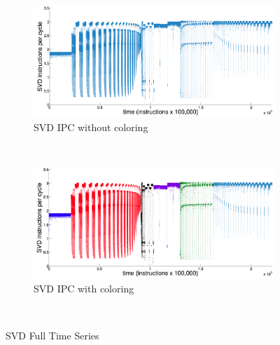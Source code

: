 \documentclass{article}
\begin{document}
\begin{figure}
        \centering
        \begin{subfigure}{\textwidth}
                \includegraphics[width=\textwidth]{figs/svdipcfull}
                \caption{SVD IPC without coloring}
                \label{fig:gull}
        \end{subfigure}%
        \newline
        ~ %
        \begin{subfigure}[b]{\textwidth}
                \includegraphics[width=\textwidth]{figs/svdipcregimescolored}
                \caption{SVD IPC with coloring}
                \label{fig:svdFullColored}
        \end{subfigure}
        ~ %
         \caption{SVD Full Time Series }\label{fig:svdFull}
\end{figure}
\end{document}
